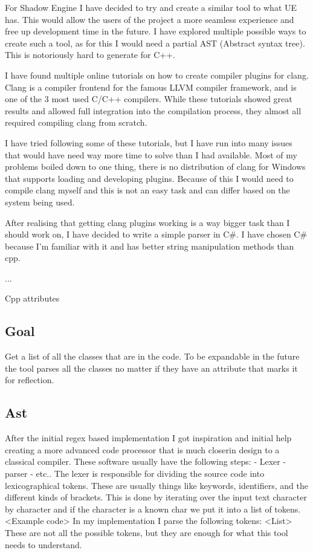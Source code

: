 For Shadow Engine I have decided to try and create a similar tool to what UE has.
This would allow the users of the project a more seamless experience and free up development time in the future.
I have explored multiple possible ways to create such a tool, as for this I would need a partial AST (Abstract syntax tree).
This is notoriously hard to generate for C++.

I have found multiple online tutorials on how to create compiler plugins for clang.
Clang is a compiler frontend for the famous LLVM compiler framework, and is one of the 3 most used C/C++ compilers.
While these tutorials showed great results and allowed full integration into the compilation process, they almost all required compiling clang from scratch.

I have tried following some of these tutorials, but I have run into many issues that would have need way more time to solve than I had available.
Most of my problems boiled down to one thing, there is no distribution of clang for Windows that supports loading and developing plugins.
Because of this I would need to compile clang myself and this is not an easy task and can differ based on the system being used.

After realising that getting clang plugins working is a way bigger task than I should work on, I have decided to write a simple parser in C\#.
I have chosen C\# because I'm familiar with it and has better string manipulation methods than cpp.

...

Cpp attributes

\subsection{Goal}
Get a list of all the classes that are in the code.
To be expandable in the future the tool parses all the classes no matter if they have an attribute that marks it for reflection.

\subsection{Ast}
After the initial regex based implementation I got inspiration and initial help creating a more advanced code processor that is much closerin design to a classical compiler.
These software usually have the following steps:
- Lexer
- parser
- etc..
The lexer is responsible for dividing the source code into lexicographical tokens.
These are usually things like keywords, identifiers, and the different kinds of brackets.
This is done by iterating over the input text character by character and if the character is a known char we put it into a list of tokens.
<Example code>
In my implementation I parse the following tokens:
<List>
These are not all the possible tokens, but they are enough for what this tool needs to understand.

